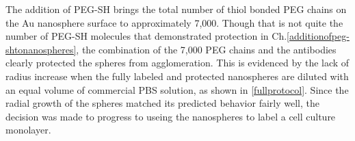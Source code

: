 The addition of PEG-SH brings the total number of thiol bonded PEG chains on the Au nanosphere surface to approximately 7,000. Though that is not quite the number of PEG-SH molecules that demonstrated protection in Ch.\autoref{additionofpeg-shtonanospheres}, the combination of the 7,000 PEG chains and the antibodies clearly protected the spheres from agglomeration. This is evidenced by the lack of radius increase when the fully labeled and protected nanospheres are diluted with an equal volume of commercial PBS solution, as shown in \autoref{fullprotocol}. Since the radial growth of the spheres matched its predicted behavior fairly well, the decision was made to progress to useing the nanospheres to label a cell culture monolayer.
